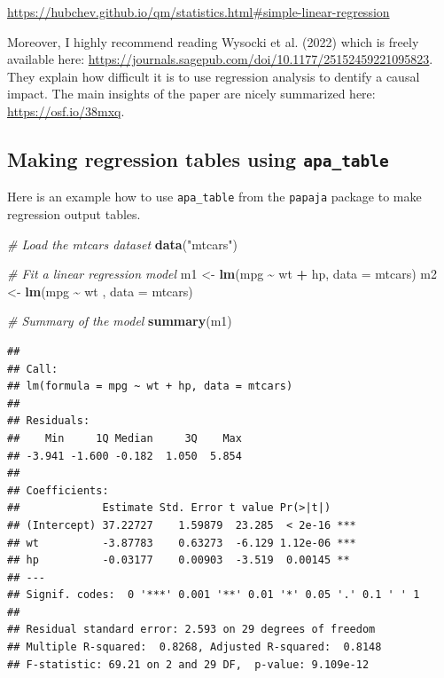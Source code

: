 \documentclass[
  doc]{apa6}
\newenvironment{Shaded}{\begin{snugshade}}{\end{snugshade}}
\newcommand{\AttributeTok}[1]{\textcolor[rgb]{0.13,0.29,0.53}{#1}}
\newcommand{\CommentTok}[1]{\textcolor[rgb]{0.56,0.35,0.01}{\textit{#1}}}
\newcommand{\FunctionTok}[1]{\textcolor[rgb]{0.13,0.29,0.53}{\textbf{#1}}}
\newcommand{\NormalTok}[1]{#1}
\newcommand{\OtherTok}[1]{\textcolor[rgb]{0.56,0.35,0.01}{#1}}
\newcommand{\SpecialCharTok}[1]{\textcolor[rgb]{0.81,0.36,0.00}{\textbf{#1}}}
\newcommand{\StringTok}[1]{\textcolor[rgb]{0.31,0.60,0.02}{#1}}
\begin{document}
\url{https://hubchev.github.io/qm/statistics.html\#simple-linear-regression}

Moreover, I highly recommend reading Wysocki et al. (2022) which is freely available here: \url{https://journals.sagepub.com/doi/10.1177/25152459221095823}. They explain how difficult it is to use regression analysis to dentify a causal impact. The main insights of the paper are nicely summarized here: \url{https://osf.io/38mxq}.

\hypertarget{making-regression-tables-using-apa_table}{%
\subsection{\texorpdfstring{Making regression tables using \texttt{apa\_table}}{Making regression tables using apa\_table}}\label{making-regression-tables-using-apa_table}}

Here is an example how to use \texttt{apa\_table} from the \texttt{papaja} package to make regression output tables.

\begin{Shaded}
\begin{Highlighting}[]
\CommentTok{\# Load the mtcars dataset}
\FunctionTok{data}\NormalTok{(}\StringTok{"mtcars"}\NormalTok{)}

\CommentTok{\# Fit a linear regression model}
\NormalTok{m1 }\OtherTok{\textless{}{-}} \FunctionTok{lm}\NormalTok{(mpg }\SpecialCharTok{\textasciitilde{}}\NormalTok{ wt }\SpecialCharTok{+}\NormalTok{ hp, }\AttributeTok{data =}\NormalTok{ mtcars)}
\NormalTok{m2 }\OtherTok{\textless{}{-}} \FunctionTok{lm}\NormalTok{(mpg }\SpecialCharTok{\textasciitilde{}}\NormalTok{ wt , }\AttributeTok{data =}\NormalTok{ mtcars)}

\CommentTok{\# Summary of the model}
\FunctionTok{summary}\NormalTok{(m1)}
\end{Highlighting}
\end{Shaded}

\begin{verbatim}
## 
## Call:
## lm(formula = mpg ~ wt + hp, data = mtcars)
## 
## Residuals:
##    Min     1Q Median     3Q    Max 
## -3.941 -1.600 -0.182  1.050  5.854 
## 
## Coefficients:
##             Estimate Std. Error t value Pr(>|t|)    
## (Intercept) 37.22727    1.59879  23.285  < 2e-16 ***
## wt          -3.87783    0.63273  -6.129 1.12e-06 ***
## hp          -0.03177    0.00903  -3.519  0.00145 ** 
## ---
## Signif. codes:  0 '***' 0.001 '**' 0.01 '*' 0.05 '.' 0.1 ' ' 1
## 
## Residual standard error: 2.593 on 29 degrees of freedom
## Multiple R-squared:  0.8268, Adjusted R-squared:  0.8148 
## F-statistic: 69.21 on 2 and 29 DF,  p-value: 9.109e-12
\end{verbatim}
\end{document}
